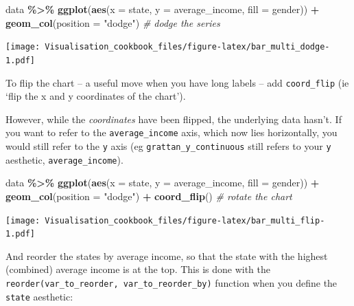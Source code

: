 \documentclass[
]{book}
\newenvironment{Shaded}{\begin{snugshade}}{\end{snugshade}}
\newcommand{\CommentTok}[1]{\textcolor[rgb]{0.56,0.35,0.01}{\textit{#1}}}
\newcommand{\DataTypeTok}[1]{\textcolor[rgb]{0.13,0.29,0.53}{#1}}
\newcommand{\KeywordTok}[1]{\textcolor[rgb]{0.13,0.29,0.53}{\textbf{#1}}}
\newcommand{\NormalTok}[1]{#1}
\newcommand{\OperatorTok}[1]{\textcolor[rgb]{0.81,0.36,0.00}{\textbf{#1}}}
\newcommand{\StringTok}[1]{\textcolor[rgb]{0.31,0.60,0.02}{#1}}
\begin{document}
\begin{Shaded}
\begin{Highlighting}[]
\NormalTok{data }\OperatorTok{\%\textgreater{}\%}\StringTok{ }
\StringTok{  }\KeywordTok{ggplot}\NormalTok{(}\KeywordTok{aes}\NormalTok{(}\DataTypeTok{x =}\NormalTok{ state,}
             \DataTypeTok{y =}\NormalTok{ average\_income,}
             \DataTypeTok{fill =}\NormalTok{ gender)) }\OperatorTok{+}\StringTok{ }
\StringTok{  }\KeywordTok{geom\_col}\NormalTok{(}\DataTypeTok{position =} \StringTok{"dodge"}\NormalTok{) }\CommentTok{\# \textquotesingle{}dodge\textquotesingle{} the series}
\end{Highlighting}
\end{Shaded}

\texttt{[image: Visualisation\_cookbook\_files/figure-latex/bar\_multi\_dodge-1.pdf]}

To flip the chart -- a useful move when you have long labels -- add \texttt{coord\_flip} (ie `flip the x and y coordinates of the chart').

However, while the \emph{coordinates} have been flipped, the underlying data hasn't. If you want to refer to the \texttt{average\_income} axis, which now lies horizontally, you would still refer to the \texttt{y} axis (eg \texttt{grattan\_y\_continuous} still refers to your \texttt{y} aesthetic, \texttt{average\_income}).

\begin{Shaded}
\begin{Highlighting}[]
\NormalTok{data }\OperatorTok{\%\textgreater{}\%}\StringTok{ }
\StringTok{  }\KeywordTok{ggplot}\NormalTok{(}\KeywordTok{aes}\NormalTok{(}\DataTypeTok{x =}\NormalTok{ state,}
             \DataTypeTok{y =}\NormalTok{ average\_income,}
             \DataTypeTok{fill =}\NormalTok{ gender)) }\OperatorTok{+}\StringTok{ }
\StringTok{  }\KeywordTok{geom\_col}\NormalTok{(}\DataTypeTok{position =} \StringTok{"dodge"}\NormalTok{) }\OperatorTok{+}\StringTok{ }
\StringTok{  }\KeywordTok{coord\_flip}\NormalTok{() }\CommentTok{\# rotate the chart}
\end{Highlighting}
\end{Shaded}

\texttt{[image: Visualisation\_cookbook\_files/figure-latex/bar\_multi\_flip-1.pdf]}

And reorder the states by average income, so that the state with the highest (combined) average income is at the top. This is done with the \texttt{reorder(var\_to\_reorder,\ var\_to\_reorder\_by)} function when you define the \texttt{state} aesthetic:
\end{document}
